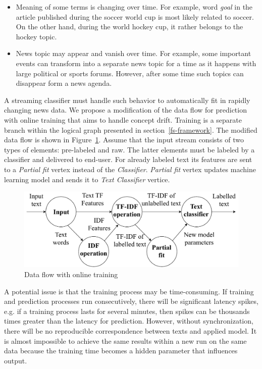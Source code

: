 \begin{itemize}
    \item Meaning of some terms is changing over time. For example, word {\em goal} in the article published during the soccer world cup is most likely related to soccer. On the other hand, during the world hockey cup, it rather belongs to the hockey topic.
    \item News topic may appear and vanish over time. For example, some important events can transform into a separate news topic for a time as it happens with large political or sports forums. However, after some time such topics can disappear form a news agenda.
\end{itemize}

A streaming classifier must handle such behavior to automatically fit in rapidly changing news data. We propose a modification of the data flow for prediction with online training that aims to handle concept drift. Training is a separate branch within the logical graph presented in section~\ref{fs-framework}. The modified data flow is shown in Figure~\ref{training_graph}. Assume that the input stream consists of two types of elements: pre-labeled and raw. The latter elements must be labeled by a classifier and delivered to end-user. For already labeled text its features are sent to a {\em Partial fit} vertex instead of the {\em Classifier}. {\em Partial fit} vertex updates machine learning model and sends it to {\em Text Classifier} vertice.

\begin{figure}[htbp]
  \centering
  \includegraphics[scale=0.32]{pics/logical-graph}
  \caption{Data flow with online training}
  \label {training_graph}
\end{figure}

A potential issue is that the training process may be time-consuming. If training and prediction processes run consecutively, there will be significant latency spikes, e.g. if a training process lasts for several minutes, then spikes can be thousands times greater than the latency for prediction. However, without synchronization, there will be no reproducible correspondence between texts and applied model. It is almost impossible to achieve the same results within a new run on the same data because the training time becomes a hidden parameter that influences output. 

